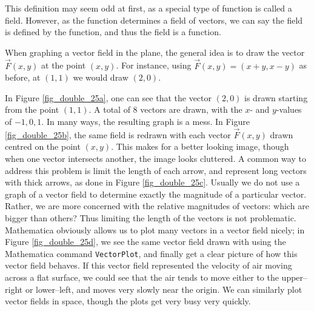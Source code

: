 This definition may seem odd at first, as a special type of function is called a field. However, as the function determines a field of vectors, we can say the field is defined by the function, and thus the field is a function.

 When graphing a vector field in the plane, the general idea is to draw the vector $\vec F(x,y)$ at the point $(x,y)$. For instance, using $\vec F(x,y) = \left( x+y,x-y\right)$ as before, at $(1,1)$ we would draw $\left( 2,0\right)$. 

In Figure \ref{fig_double_25a}, one can see that the vector $\left( 2,0\right)$ is drawn starting from the point $(1,1)$. A total of 8 vectors are drawn, with the $x$- and $y$-values of $-1,0,1$. In many ways, the resulting graph is a mess. In Figure \ref{fig_double_25b}, the same field is redrawn with each vector $\vec F(x,y)$ drawn centred on the point $(x,y)$. This makes for a better looking image, though when one vector intersects another, the image looks cluttered.
\ifmathematica
A common way to address this problem is limit the length of each arrow, and represent long vectors with thick arrows, as done in Figure \ref{fig_double_25c}. Usually we do not use a graph of a vector field to determine exactly the magnitude of a particular vector. Rather, we are more concerned with the relative magnitudes of vectors: which are bigger than others? Thus limiting the length of the vectors is not problematic. Mathematica obviously allows us to plot many vectors in a vector field nicely; in Figure \ref{fig_double_25d}, we see the same vector field drawn with using the Mathematica command \lstinline{VectorPlot}, and finally get a clear picture of how this vector field behaves. If this vector field represented the velocity of air moving across a flat surface, we could see that the air tends to move either to the upper--right or lower--left, and moves very slowly near the origin.  We can similarly plot vector fields in space, though the plots get very busy very quickly.


